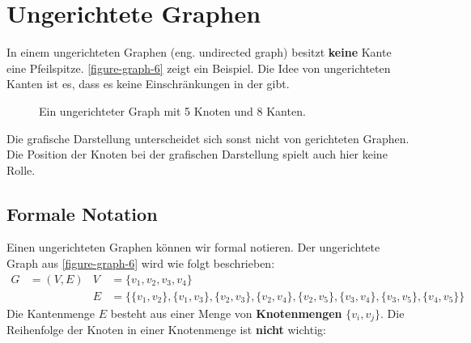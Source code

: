 \section{Ungerichtete Graphen}

In einem ungerichteten Graphen (eng. undirected graph) besitzt \textbf{keine} Kante eine Pfeilspitze. \autoref{figure-graph-6} zeigt ein Beispiel. Die Idee von ungerichteten Kanten ist es, dass es keine Einschränkungen in der  gibt.

\begin{figure}[htb]
\centering
{}
\caption{Ein ungerichteter Graph mit 5 Knoten und 8 Kanten.}
\label{figure-graph-6}
\end{figure}

Die grafische Darstellung unterscheidet sich sonst nicht von gerichteten Graphen. Die Position der Knoten bei der grafischen Darstellung spielt auch hier keine Rolle.

\subsection{Formale Notation}

Einen ungerichteten Graphen können wir formal notieren. Der ungerichtete Graph aus \autoref{figure-graph-6} wird wie folgt beschrieben:
\begin{align*}
G & = (V, E) & V & = \{v_1, v_2, v_3, v_4\} \\
& & E & = \{\{v_1, v_2\},\{v_1, v_3\},\{v_2, v_3\},\{v_2, v_4\},\{v_2, v_5\},\{v_3, v_4\},\{v_3, v_5\},\{v_4, v_5\}\}
\end{align*}
Die Kantenmenge $E$ besteht aus einer Menge von \textbf{Knotenmengen} $\{v_i, v_j\}$. Die Reihenfolge der Knoten in einer Knotenmenge ist \textbf{nicht} wichtig:

